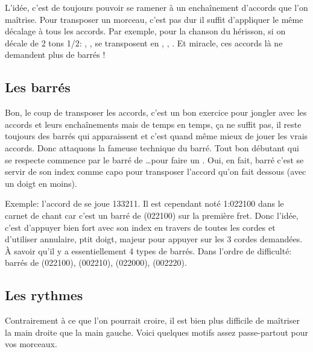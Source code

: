 \documentclass[versionenligne]{framabook}
\begin{document}
L'idée, c'est de toujours pouvoir se ramener à un enchaînement
d'accords que l'on maîtrise.  Pour transposer un morceau, c'est pas
dur il suffit d'appliquer le même décalage à tous les accords.  Par
exemple, pour la chanson du hérisson, si on décale de 2 tons 1/2:
, ,  se transposent en
, , .  Et miracle, ces accords
là ne demandent plus de barrés !

\subsection{Les barrés}

Bon, le coup de transposer les accords, c'est un bon exercice pour
jongler avec les accords et leurs enchaînements mais de temps en
temps, ça ne suffit pas, il reste toujours des barrés qui apparaissent
et c'est quand même mieux de jouer les vrais accords. Donc attaquons
la fameuse technique du barré. Tout bon débutant qui se respecte
commence par le barré de  \dots pour faire un
. Oui, en fait, barré c'est se servir de son index comme
capo pour transposer l'accord qu'on fait dessous (avec un doigt en
moins).

Exemple: l'accord de  se joue 133211. Il est cependant
noté 1:022100 dans le carnet de chant car c'est un barré de
 (022100) sur la première fret.  Donc l'idée, c'est
d'appuyer bien fort avec son index en travers de toutes les cordes et
d'utiliser annulaire, ptit doigt, majeur pour appuyer sur les 3 cordes
demandées. À savoir qu'il y a essentiellement 4 types de barrés.  Dans
l'ordre de difficulté: barrés de  (022100), 
(002210),  (022000),  (002220).

\subsection{Les rythmes}

Contrairement à ce que l'on pourrait croire, il est bien plus
difficile de maîtriser la main droite que la main gauche.
Voici quelques motifs assez passe-partout pour vos morceaux.
\end{document}
